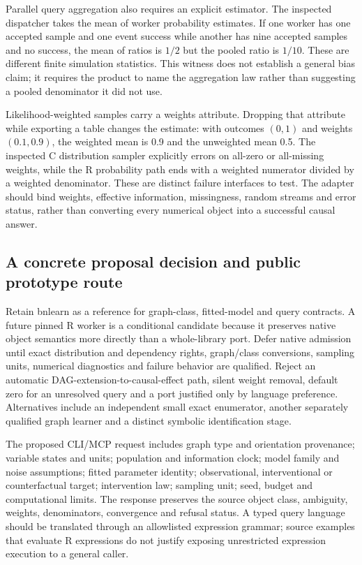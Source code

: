 Parallel query aggregation also requires an explicit estimator. The inspected dispatcher takes the mean of worker probability estimates. If one worker has one accepted sample and one event success while another has nine accepted samples and no success, the mean of ratios is $1/2$ but the pooled ratio is $1/10$. These are different finite simulation statistics. This witness does not establish a general bias claim; it requires the product to name the aggregation law rather than suggesting a pooled denominator it did not use.\citep{exec24_bnlearn_sources,exec24_bnlearn_contract}

Likelihood-weighted samples carry a weights attribute. Dropping that attribute while exporting a table changes the estimate: with outcomes $(0,1)$ and weights $(0.1,0.9)$, the weighted mean is 0.9 and the unweighted mean 0.5. The inspected C distribution sampler explicitly errors on all-zero or all-missing weights, while the R probability path ends with a weighted numerator divided by a weighted denominator. These are distinct failure interfaces to test. The adapter should bind weights, effective information, missingness, random streams and error status, rather than converting every numerical object into a successful causal answer.\citep{exec24_bnlearn_sources,exec24_bnlearn_contract}

\subsection{A concrete proposal decision and public prototype route}
Retain bnlearn as a reference for graph-class, fitted-model and query contracts. A future pinned R worker is a conditional candidate because it preserves native object semantics more directly than a whole-library port. Defer native admission until exact distribution and dependency rights, graph/class conversions, sampling units, numerical diagnostics and failure behavior are qualified. Reject an automatic DAG-extension-to-causal-effect path, silent weight removal, default zero for an unresolved query and a port justified only by language preference. Alternatives include an independent small exact enumerator, another separately qualified graph learner and a distinct symbolic identification stage.\citep{exec24_bnlearn_contract}

The proposed CLI/MCP request includes graph type and orientation provenance; variable states and units; population and information clock; model family and noise assumptions; fitted parameter identity; observational, interventional or counterfactual target; intervention law; sampling unit; seed, budget and computational limits. The response preserves the source object class, ambiguity, weights, denominators, convergence and refusal status. A typed query language should be translated through an allowlisted expression grammar; source examples that evaluate R expressions do not justify exposing unrestricted expression execution to a general caller.\citep{exec24_bnlearn_sources,exec24_bnlearn_contract}

